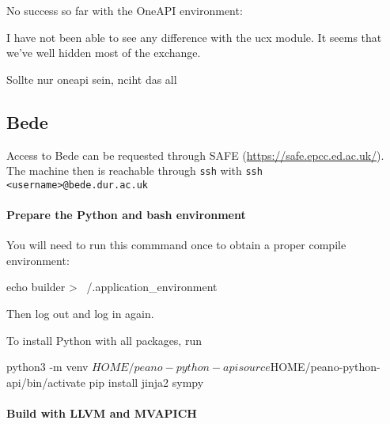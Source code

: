 No success so far with the OneAPI environment:


I have not been able to see any difference with the ucx module. It seems that
we've well hidden most of the exchange.




Sollte nur oneapi sein, nciht das all







\subsection{Bede}


Access to Bede can be requested through SAFE
(\url{https://safe.epcc.ed.ac.uk/}).
The machine then is reachable through \texttt{ssh} with \texttt{ssh
<username>@bede.dur.ac.uk}


\paragraph{Prepare the Python and bash environment}

You will need to run this commmand once to obtain a proper compile environment:
\begin{code}
echo builder > ~/.application_environment
\end{code}
Then log out and log in again.


To install Python with all packages, run
\begin{code}
python3 -m venv $HOME/peano-python-api
source $HOME/peano-python-api/bin/activate
pip install jinja2 sympy
\end{code}


\paragraph{Build with LLVM and MVAPICH}


